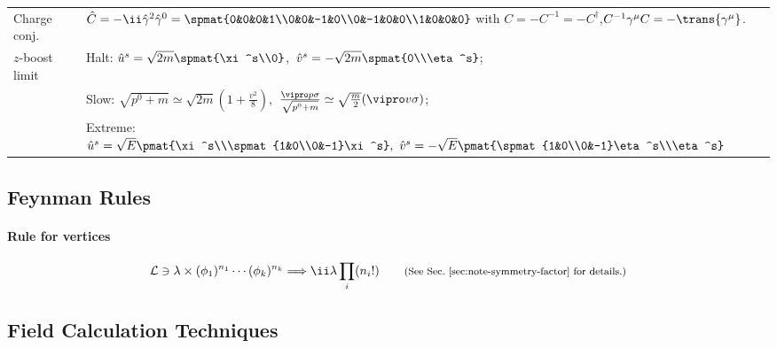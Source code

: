 \begin{tabular}{l@{ :\ \ \ }l}
Charge conj. & $\hat C=-\ii\hat\gamma^2\hat\gamma^0
 = \spmat{0&0&0&1\\0&0&-1&0\\0&-1&0&0\\1&0&0&0}$\qquad
                 with $C=-C^{-1}=-C^\dagger$,\quad $C^{-1}\Gm C=-\trans{\Gm}$.\\
$z$-boost limit &
Halt: $\hat u^s=\sqrt{2m}\spmat{\xi^s\\0}$,\ $\hat v^s=-\sqrt{2m}\spmat{0\\\eta^s}$;\\
&Slow:
$\sqrt{p^0+m}\simeq\sqrt{2m}(1+\frac{v^2}8)$,\
$\frac{\vipro p\sigma}{\sqrt{p^0+m}}\simeq\sqrt{\frac m2}(\vipro v\sigma)$;\\
&Extreme: 
  $\hat u^s=\sqrt E\pmat{\xi^s\\\spmat{1&0\\0&-1}\xi^s},\
   \hat v^s=-\sqrt E\pmat{\spmat{1&0\\0&-1}\eta^s\\\eta^s}$\\
\end{tabular}




\subsection{Feynman Rules}
\paragraph{Rule for vertices}
\begin{equation*}
 \Lag\ni\lambda\times (\phi_1)^{n_1}\cdots(\phi_k)^{n_k} \Longrightarrow \ii\lambda \prod_i(n_i!)
\qquad\text{\footnotesize (See Sec.~\ref{sec:note-symmetry-factor} for details.)}
\end{equation*}


\newpage

\twocolumn

\onecolumn


\newpage
\subsection{Field Calculation Techniques}
